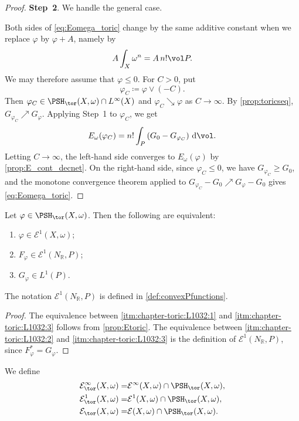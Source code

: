 \begin{proof}
    \textbf{Step~2}. We handle the general case.

    Both sides of \eqref{eq:Eomega_toric} change by the same additive constant when we replace $\varphi$ by $\varphi+A$, namely by
    \[
        A\int_X\omega^n=A\,n!\vol P.
    \]
    We may therefore assume that $\varphi\leq 0$. For $C>0$, put
    \[
        \varphi_C\coloneqq \varphi\lor(-C).
    \]
    Then $\varphi_C\in \PSH_{\tor}(X,\omega)\cap L^{\infty}(X)$ and $\varphi_C\searrow \varphi$ as $C\to\infty$. By \cref{prop:toricseq}, $G_{\varphi_C}\nearrow G_{\varphi}$. Applying Step~1 to $\varphi_C$, we get
    \[
        E_{\omega}(\varphi_C)=n!\int_P \left(G_0-G_{\varphi_C}\right)\,\mathrm{d}\vol.
    \]
    Letting $C\to\infty$, the left-hand side converges to $E_{\omega}(\varphi)$ by \cref{prop:E_cont_decnet}. On the right-hand side, since $\varphi_C\leq 0$, we have $G_{\varphi_C}\geq G_0$, and the monotone convergence theorem applied to $G_{\varphi_C}-G_0\nearrow G_{\varphi}-G_0$ gives \eqref{eq:Eomega_toric}.
\end{proof}

\begin{corollary}\label{cor:toric-ample:L1092}
    Let $\varphi\in \PSH_{\tor}(X,\omega)$. Then the following are equivalent:
    \begin{enumerate}
        \item\label{itm:chapter-toric:L1032:1} $\varphi\in \mathcal{E}^1(X,\omega)$;
        \item\label{itm:chapter-toric:L1032:2} $F_{\varphi}\in \mathcal{E}^1(N_{\mathbb{R}},P)$;
        \item\label{itm:chapter-toric:L1032:3} $G_{\varphi}\in L^1(P)$.
    \end{enumerate}
\end{corollary}
The notation $\mathcal{E}^1(N_{\mathbb{R}},P)$ is defined in \cref{def:convexPfunctions}.
\begin{proof}
    The equivalence between \ref{itm:chapter-toric:L1032:1} and \ref{itm:chapter-toric:L1032:3} follows from \cref{prop:Etoric}. The equivalence between \ref{itm:chapter-toric:L1032:2} and \ref{itm:chapter-toric:L1032:3} is the definition of $\mathcal{E}^1(N_{\mathbb{R}},P)$, since $F_{\varphi}^*=G_{\varphi}$.
\end{proof}
\begin{definition}\label{def:toric-ample:L1104}
    We define
    \[
        \begin{aligned}
        \mathcal{E}^{\infty}_{\tor}(X,\omega)= & \mathcal{E}^{\infty}(X,\omega) \cap \PSH_{\tor}(X,\omega),\\
        \mathcal{E}^{1}_{\tor}(X,\omega)= & \mathcal{E}^{1}(X,\omega) \cap \PSH_{\tor}(X,\omega),\\
        \mathcal{E}_{\tor}(X,\omega)= & \mathcal{E}(X,\omega) \cap \PSH_{\tor}(X,\omega).
        \end{aligned}
    \]
\end{definition}


